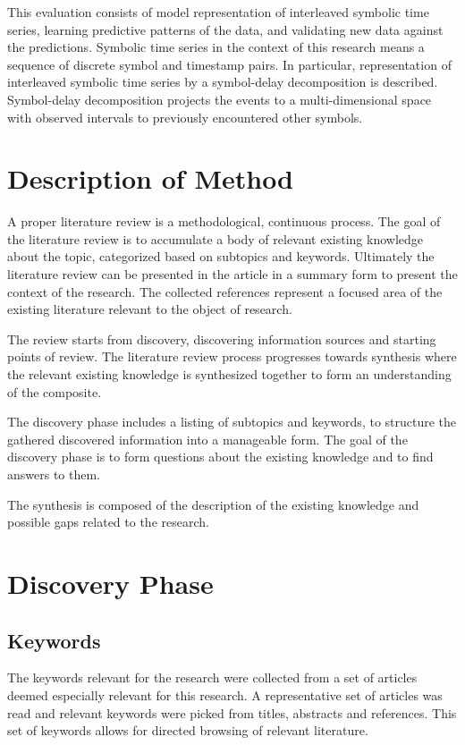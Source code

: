 \documentclass[a4paper,10pt]{article}
\begin{document}
This evaluation consists of model representation of interleaved symbolic time series, learning predictive patterns of the data, and validating new data against the predictions.
Symbolic time series in the context of this research means a sequence of discrete symbol and timestamp pairs.
In particular, representation of interleaved symbolic time series by a symbol-delay decomposition is described.
Symbol-delay decomposition projects the events to a multi-dimensional space with observed intervals
to previously encountered other symbols.

\section{Description of Method}

A proper literature review is a methodological, continuous process. The goal of the literature review is to accumulate a body of relevant existing knowledge
about the topic, categorized based on subtopics and keywords.
Ultimately the literature review can be presented in the article in a summary form to present the context of the research.
The collected references represent a focused area of the existing literature relevant to the object of research.

The review starts from discovery, discovering information sources and starting points of review. The literature review process progresses towards synthesis
where the relevant existing knowledge is synthesized together to form an understanding of the composite.

The discovery phase includes a listing of subtopics and keywords, to structure the gathered discovered information into a manageable form. The goal
of the discovery phase is to form questions about the existing knowledge and to find answers to them.

The synthesis is composed of the description of the existing knowledge and possible gaps related to the research.

\section{Discovery Phase}

\subsection{Keywords}

The keywords relevant for the research were collected from a set of articles deemed especially relevant for this research. A representative set of articles was
read and relevant keywords were picked from titles, abstracts and references. This set of keywords allows for directed browsing of relevant literature.
\end{document}
